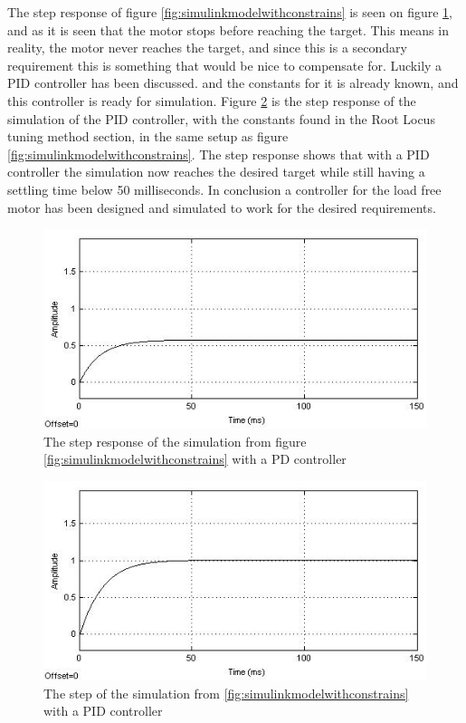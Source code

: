 The step response of figure \ref{fig:simulinkmodelwithconstrains} is seen on figure \ref{fig:SimuStepPDWithConstrains}, and as it is seen that the motor stops before reaching the target. This means in reality, the motor never reaches the target, and since this is a secondary requirement this is something that would be nice to compensate for. Luckily a PID controller has been discussed. and the constants for it is already known, and this controller is ready for simulation. Figure \ref{fig:SimuStepPIDWithConstrains} is the step response of the simulation of the PID controller, with the constants found in the Root Locus tuning method section, in the same setup as figure \ref{fig:simulinkmodelwithconstrains}. The step response shows that with a PID controller the simulation now reaches the desired target while still having a settling time below 50 milliseconds. In conclusion a controller for the load free motor has been designed and simulated to work for the desired requirements.


\begin{figure}[h!]
\centering
\includegraphics[scale=0.7]{Billeder/SimuStepPDWithConstrains.jpg}
\caption{ The step response of  the simulation from figure \ref{fig:simulinkmodelwithconstrains} with a PD controller }
\label{fig:SimuStepPDWithConstrains}
\end{figure}


\begin{figure}[h!]
\centering
\includegraphics[scale=0.7]{Billeder/SimuStepPIDWithConstrains.jpg}
\caption{ The step of the simulation from \ref{fig:simulinkmodelwithconstrains} with a PID controller }
\label{fig:SimuStepPIDWithConstrains}
\end{figure}

